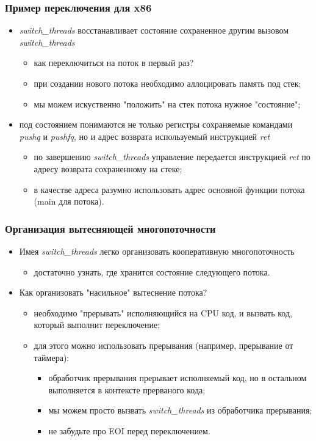 \begin{frame}
\frametitle{Пример переключения для x86}
\begin{itemize}
  \item \emph{switch\_threads} восстанавливает состояние сохраненное другим
  вызовом \emph{switch\_threads}
  \begin{itemize}
    \item как переключиться на поток в первый раз?
    \item при создании нового потока необходимо аллоцировать память под стек;
    \item мы можем искуственно "положить" на стек потока нужное "состояние";
  \end{itemize}
  \item под состоянием понимаются не только регистры сохраняемые командами
  \emph{pushq} и \emph{pushfq}, но и адрес возврата используемый инструкцией
  \emph{ret}
  \begin{itemize}
    \item по завершению \emph{switch\_threads} управление передается инструкцией
    \emph{ret} по адресу возврата сохраненному на стеке;
    \item в качестве адреса разумно использовать адрес основной функции потока
    (main для потока).
  \end{itemize}
\end{itemize}
\end{frame}

\begin{frame}
\frametitle{Организация вытесняющей многопоточности}
\begin{itemize}
  \item Имея \emph{switch\_threads} легко организовать кооперативную
  многопоточность
  \begin{itemize}
    \item достаточно узнать, где хранится состояние следующего потока.
  \end{itemize}
  \item Как организовать "насильное" вытеснение потока?
  \begin{itemize}
    \item необходимо "прерывать" исполняющийся на CPU код, и вызвать код,
    который выполнит переключение;
    \item для этого можно использовать прерывания (например, прерывание от
    таймера):
    \begin{itemize}
      \item обработчик прерывания прерывает исполняемый код, но в остальном
      выполняется в контексте прерваного кода;
      \item мы можем просто вызвать \emph{switch\_threads} из обработчика
      прерывания;
      \item не забудьте про EOI перед переключением.
    \end{itemize}
  \end{itemize}
\end{itemize}
\end{frame}

